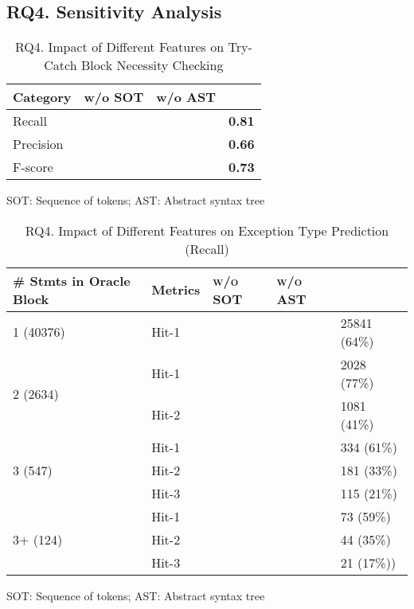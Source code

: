 \subsection{RQ4. Sensitivity Analysis }
\label{sec:rq4}


\begin{table}[h]
	\caption{RQ4. Impact of Different Features on Try-Catch Block Necessity Checking}
	\begin{center}
		\renewcommand{\arraystretch}{1}
		\begin{tabular}{p{1.75cm}<{\centering}p{1.75cm}<{\centering}p{1.75cm}<{\centering}p{1.75cm}<{\centering}}
			\hline
			Category  & \tool w/o SOT & \tool w/o AST & \tool \\
			\hline
			Recall    & & & \textbf{0.81} \\
			Precision & & &\textbf{0.66} \\
			F-score   & & &\textbf{0.73} \\
			\hline
		\end{tabular}
		SOT: Sequence of tokens; AST: Abstract syntax tree
		\label{RQ4_results_1}
	\end{center}
\end{table}

{\color{red}{Without sequence of tokens or AST in try-catch block necessity checking will lead to the reduce of results. Once I finish this sensitivity experiments, I will update this table. }}

\begin{table}[t]
	\caption{RQ4. Impact of Different Features on Exception Type Prediction (Recall)}
	\tabcolsep 2pt
	{\small
		\begin{center}
			\renewcommand{\arraystretch}{1}
			\begin{tabular}{p{1.5cm}<{\centering}|p{1cm}<{\centering}|p{1.5cm}<{\centering}|p{1.5cm}<{\centering}|p{1.5cm}<{\centering}}
				\hline
				\# Stmts in Oracle Block& Metrics &{\textsc{\tool w/o SOT}\xspace}&{\textsc{\tool w/o AST}\xspace}& {\textsc{\tool}\xspace} \\
				\hline
				\multirow{1}{*}{1 (40376)}   & Hit-1  &&& 25841 (64\%) \\
				\hline
				\multirow{2}{*}{2 (2634)}  & Hit-1   &&& 2028 (77\%) \\
				& Hit-2         &&&  1081 (41\%) \\
				\hline
				\multirow{3}{*}{3 (547)}  & Hit-1    &&& 334 (61\%) \\
				& Hit-2     &&& 181 (33\%)\\
				& Hit-3     &&& 115 (21\%) \\
				\hline
				\multirow{4}{*}{3+ (124)}  & Hit-1   &&& 73 (59\%) \\
				& Hit-2     &&& 44 (35\%) \\
				& Hit-3     &&& 21 (17\%))\\
				\hline
			\end{tabular}
		SOT: Sequence of tokens; AST: Abstract syntax tree		
			\label{RQ4_results_2}
		\end{center}
	}
\end{table}

